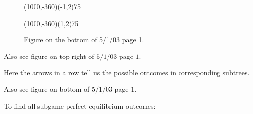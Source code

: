 \documentclass[12pt]{article}
\newcommand{\n}{\noindent}
\newcommand{\s}{\vspace{5mm}}
\begin{document}
\begin{figure}[htb]
\begin{egame}
\renewcommand{\egarrowstyle}{}

\putbranch(1000,-360)(-1,2){75}

\renewcommand{\egarrowstyle}{}

\putbranch(1000,-360)(1,2){75}






%
\end{egame}
\hspace*{\fill}\s\s\s\s\s\s\s\s\s\s\s\s
\caption[]{Figure on the bottom of 5/1/03 page 1.}\label{f:sixteen}
\end{figure}

\begin{center}  Also see figure on top right of $5/1/03$ page $1$.
\end{center}

\s
\n  Here the arrows in a row tell us the possible outcomes in corresponding subtrees.
\begin{center} Also see figure on bottom of $5/1/03$ page $1$.
\end{center}

\s
\n  To find all subgame perfect equilibrium outcomes:
\end{document}
